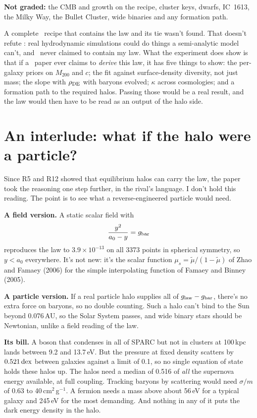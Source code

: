 \textbf{Not graded:} the CMB and growth on the recipe, cluster keys, dwarfs, IC~1613, the Milky Way, the Bullet Cluster, wide binaries and any formation path.

\begin{honestbox}
A complete \LCDM\ recipe that contains the law and its tie wasn't found. That doesn't refute \LCDM: real hydrodynamic simulations could do things a semi-analytic model can't, and \LCDM\ never claimed to contain my law. What the experiment does show is that if a \LCDM\ paper ever claims to \emph{derive} this law, it has five things to show: the per-galaxy priors on $M_{200}$ and $c$; the fit against surface-density diversity, not just mass; the slope with $\rho_{\rm DE}$ with baryons evolved; $\kappa$ across cosmologies; and a formation path to the required halos. Passing those would be a real result, and the law would then have to be read as an output of the halo side.
\end{honestbox}

\section{An interlude: what if the halo were a particle?}

Since R5 and R12 showed that equilibrium halos can carry the law, the paper took the reasoning one step further, in the rival's language. I don't hold this reading. The point is to see what a reverse-engineered particle would need.

\textbf{A field version.} A static scalar field with
\begin{equation}
\frac{y^2}{a_0-y}=g_{\rm bar}
\end{equation}
reproduces the law to $3.9\times10^{-13}$ on all 3373 points in spherical symmetry, so $y<a_0$ everywhere. It's not new: it's the scalar function $\mu_s=\tilde\mu/(1-\tilde\mu)$ of Zhao and Famaey (2006) for the simple interpolating function of Famaey and Binney (2005).

\textbf{A particle version.} If a real particle halo supplies all of $g_{\rm law}-g_{\rm bar}$, there's no extra force on baryons, so no double counting. Such a halo can't bind to the Sun beyond 0.076\,AU, so the Solar System passes, and wide binary stars should be Newtonian, unlike a field reading of the law.

\textbf{Its bill.} A boson that condenses in all of SPARC but not in clusters at 100\,kpc lands between 9.2 and 13.7\,eV. But the pressure at fixed density scatters by $0.521\,\mathrm{dex}$ between galaxies against a limit of 0.1, so no single equation of state holds these halos up. The halos need a median of 0.516 of \emph{all} the supernova energy available, at full coupling. Tracking baryons by scattering would need $\sigma/m$ of 0.63 to 40\,cm$^2$\,g$^{-1}$. A fermion needs a mass above about 56\,eV for a typical galaxy and 245\,eV for the most demanding. And nothing in any of it puts the dark energy density in the halo.

